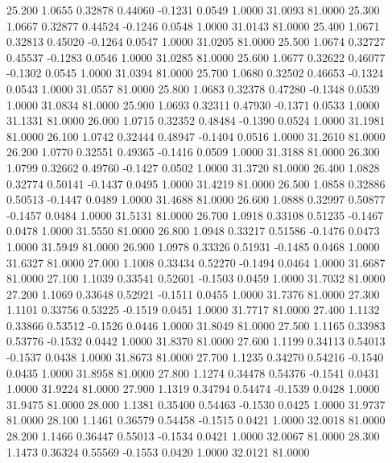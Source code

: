   25.200   1.0655   0.32878   0.44060  -0.1231   0.0549   1.0000  31.0093  81.0000
  25.300   1.0667   0.32877   0.44524  -0.1246   0.0548   1.0000  31.0143  81.0000
  25.400   1.0671   0.32813   0.45020  -0.1264   0.0547   1.0000  31.0205  81.0000
  25.500   1.0674   0.32727   0.45537  -0.1283   0.0546   1.0000  31.0285  81.0000
  25.600   1.0677   0.32622   0.46077  -0.1302   0.0545   1.0000  31.0394  81.0000
  25.700   1.0680   0.32502   0.46653  -0.1324   0.0543   1.0000  31.0557  81.0000
  25.800   1.0683   0.32378   0.47280  -0.1348   0.0539   1.0000  31.0834  81.0000
  25.900   1.0693   0.32311   0.47930  -0.1371   0.0533   1.0000  31.1331  81.0000
  26.000   1.0715   0.32352   0.48484  -0.1390   0.0524   1.0000  31.1981  81.0000
  26.100   1.0742   0.32444   0.48947  -0.1404   0.0516   1.0000  31.2610  81.0000
  26.200   1.0770   0.32551   0.49365  -0.1416   0.0509   1.0000  31.3188  81.0000
  26.300   1.0799   0.32662   0.49760  -0.1427   0.0502   1.0000  31.3720  81.0000
  26.400   1.0828   0.32774   0.50141  -0.1437   0.0495   1.0000  31.4219  81.0000
  26.500   1.0858   0.32886   0.50513  -0.1447   0.0489   1.0000  31.4688  81.0000
  26.600   1.0888   0.32997   0.50877  -0.1457   0.0484   1.0000  31.5131  81.0000
  26.700   1.0918   0.33108   0.51235  -0.1467   0.0478   1.0000  31.5550  81.0000
  26.800   1.0948   0.33217   0.51586  -0.1476   0.0473   1.0000  31.5949  81.0000
  26.900   1.0978   0.33326   0.51931  -0.1485   0.0468   1.0000  31.6327  81.0000
  27.000   1.1008   0.33434   0.52270  -0.1494   0.0464   1.0000  31.6687  81.0000
  27.100   1.1039   0.33541   0.52601  -0.1503   0.0459   1.0000  31.7032  81.0000
  27.200   1.1069   0.33648   0.52921  -0.1511   0.0455   1.0000  31.7376  81.0000
  27.300   1.1101   0.33756   0.53225  -0.1519   0.0451   1.0000  31.7717  81.0000
  27.400   1.1132   0.33866   0.53512  -0.1526   0.0446   1.0000  31.8049  81.0000
  27.500   1.1165   0.33983   0.53776  -0.1532   0.0442   1.0000  31.8370  81.0000
  27.600   1.1199   0.34113   0.54013  -0.1537   0.0438   1.0000  31.8673  81.0000
  27.700   1.1235   0.34270   0.54216  -0.1540   0.0435   1.0000  31.8958  81.0000
  27.800   1.1274   0.34478   0.54376  -0.1541   0.0431   1.0000  31.9224  81.0000
  27.900   1.1319   0.34794   0.54474  -0.1539   0.0428   1.0000  31.9475  81.0000
  28.000   1.1381   0.35400   0.54463  -0.1530   0.0425   1.0000  31.9737  81.0000
  28.100   1.1461   0.36579   0.54458  -0.1515   0.0421   1.0000  32.0018  81.0000
  28.200   1.1466   0.36447   0.55013  -0.1534   0.0421   1.0000  32.0067  81.0000
  28.300   1.1473   0.36324   0.55569  -0.1553   0.0420   1.0000  32.0121  81.0000
